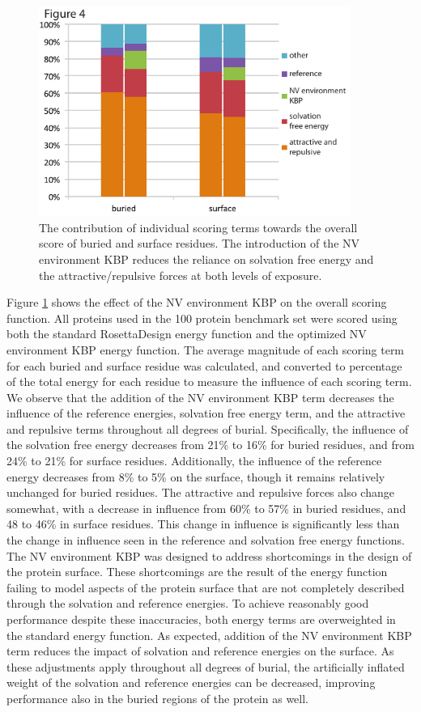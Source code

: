 \begin{figure}
\centering
\includegraphics[width=4in]{figures/nv_kbp/term_contribution}
\caption{
The contribution of individual scoring terms towards the overall score of buried and surface residues.
The introduction of the NV environment KBP reduces the reliance on solvation free energy and the attractive/repulsive forces at both levels of exposure. 
}
\label{fig:term_contribution}
\end{figure}

Figure \ref{fig:term_contribution} shows the effect of the NV environment KBP on the overall scoring function.
All proteins used in the 100 protein benchmark set were scored using both the standard RosettaDesign energy function and the optimized NV environment KBP energy function. 
The average magnitude of each scoring term for each buried and surface residue was calculated, and converted to percentage of the total energy for each residue to measure the influence of each scoring term.
We observe that the addition of the NV environment KBP term decreases the influence of the reference energies, solvation free energy term, and the attractive and repulsive terms throughout all degrees of burial.
Specifically, the influence of the solvation free energy decreases from 21\% to 16\% for buried residues, and from 24\% to 21\% for surface residues.
Additionally, the influence of the reference energy decreases from 8\% to 5\% on the surface, though it remains relatively unchanged for buried residues.
The attractive and repulsive forces also change somewhat, with a decrease in influence from 60\% to 57\% in buried residues, and 48 to 46\% in surface residues.
This change in influence is significantly less than the change in influence seen in the reference and solvation free energy functions.
The NV environment KBP was designed to address shortcomings in the design of the protein surface.
These shortcomings are the result of the energy function failing to model aspects of the protein surface that are not completely described through the solvation and reference energies.
To achieve reasonably good performance despite these inaccuracies, both energy terms are overweighted in the standard energy function.
As expected, addition of the NV environment KBP term reduces the impact of solvation and reference energies on the surface.
As these adjustments apply throughout all degrees of burial, the artificially inflated weight of the solvation and reference energies can be decreased, improving performance also in the buried regions of the protein as well.

